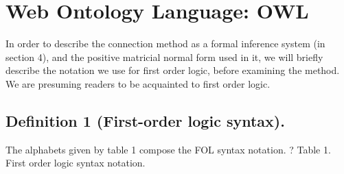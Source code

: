 \chapter{Web Ontology Language: OWL}
\label{ch:webontologylanguageowl}

In order to describe the connection method as a formal inference system (in section 4), and the positive matricial normal form used in it, we will briefly describe the notation we use for first order logic, before examining the method. We are presuming readers to be acquainted to first order logic.

\section{Definition 1 (First-order logic syntax).}
The alphabets given by table 1 compose the FOL syntax notation.	? Table 1. First order logic syntax notation.